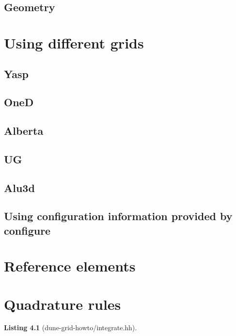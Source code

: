 \documentclass[11pt,a4paper,headinclude,footinclude,DIV14,BCOR8.25mm,titlepage,twoside,openright,normalheadings]{scrreprt}
\newtheorem{lst}{Listing}
\begin{document}
\section{Geometry}



\chapter{Using different grids}

\section{Yasp}

\section{OneD}

\section{Alberta}

\section{UG}

\section{Alu3d}

\section{Using configuration information provided by configure}



\chapter{Reference elements}

\chapter{Quadrature rules}

\begin{lst}[dune-grid-howto/integrate.hh] \mbox{}


\end{lst}
\end{document}
